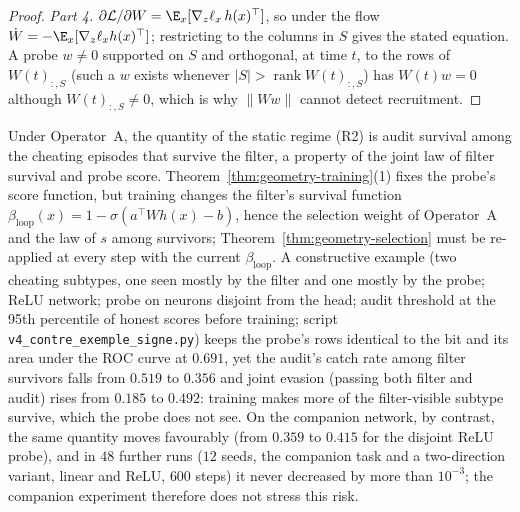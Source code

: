 \begin{proof}
\emph{Part 4.} $\partial \mathcal{L}/\partial W = \E_x[\nabla_z \ell_x\, h(x)^\top]$, so under the flow $\dot W = -\E_x[\nabla_z\ell_x h(x)^\top]$; restricting to the columns in $S$ gives the stated equation. A probe $w \neq 0$ supported on $S$ and orthogonal, at time $t$, to the rows of $W(t)_{:,S}$ (such a $w$ exists whenever $|S| > \operatorname{rank} W(t)_{:,S}$) has $W(t) w = 0$ although $W(t)_{:,S} \neq 0$, which is why $\|Ww\|$ cannot detect recruitment.
\end{proof}

\begin{remark}\label{rem:instrument-vs-audit}
Under Operator~A, the quantity of the static regime (R2) is audit survival among the cheating episodes that survive the filter, a property of the joint law of filter survival and probe score. Theorem~\ref{thm:geometry-training}(1) fixes the probe's score function, but training changes the filter's survival function $\beta_{\mathrm{loop}}(x) = 1 - \sigma(a^\top W h(x) - b)$, hence the selection weight of Operator~A and the law of $s$ among survivors; Theorem~\ref{thm:geometry-selection} must be re-applied at every step with the current $\beta_{\mathrm{loop}}$. A constructive example (two cheating subtypes, one seen mostly by the filter and one mostly by the probe; ReLU network; probe on neurons disjoint from the head; audit threshold at the 95th percentile of honest scores before training; script \texttt{v4\_contre\_exemple\_signe.py}) keeps the probe's rows identical to the bit and its area under the ROC curve at $0.691$, yet the audit's catch rate among filter survivors falls from $0.519$ to $0.356$ and joint evasion (passing both filter and audit) rises from $0.185$ to $0.492$: training makes more of the filter-visible subtype survive, which the probe does not see. On the companion network, by contrast, the same quantity moves favourably (from $0.359$ to $0.415$ for the disjoint ReLU probe), and in $48$ further runs ($12$ seeds, the companion task and a two-direction variant, linear and ReLU, $600$ steps) it never decreased by more than $10^{-3}$; the companion experiment therefore does not stress this risk.
\end{remark}

